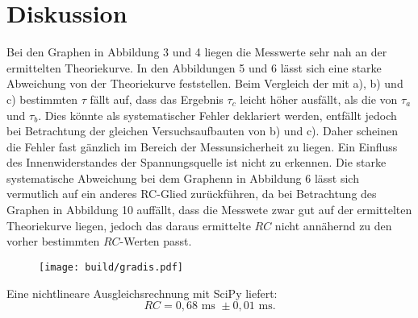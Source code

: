 \section{Diskussion}
\label{sec:Diskussion}\textbf{}
Bei den Graphen in Abbildung 3 und 4 liegen die Messwerte sehr nah an der ermittelten Theoriekurve. In den Abbildungen 5 und 6 lässt sich eine starke Abweichung von der Theoriekurve feststellen.
Beim Vergleich der mit a), b) und c) bestimmten $\tau$ fällt auf, dass das Ergebnis $\tau_c$ leicht höher ausfällt, als die von $\tau_a$ und $\tau_b$. Dies könnte als systematischer Fehler deklariert werden, entfällt jedoch bei Betrachtung der gleichen Versuchsaufbauten von b) und c). Daher scheinen die Fehler fast gänzlich im Bereich der Messunsicherheit zu liegen. Ein Einfluss des Innenwiderstandes der Spannungsquelle ist nicht zu erkennen. Die starke systematische Abweichung bei dem Graphenn in Abbildung 6 lässt sich vermutlich auf ein anderes RC-Glied zurückführen, da bei Betrachtung des Graphen in Abbildung 10 auffällt, dass die Messwete zwar gut auf der ermittelten Theoriekurve liegen, jedoch das daraus ermittelte $RC$ nicht annähernd zu den vorher bestimmten $RC$-Werten passt.
\begin{figure}[H]
	\centering
	\caption{}
	\texttt{[image: build/gradis.pdf]}
	\label{fig:Dis}
\end{figure}
Eine nichtlineare Ausgleichsrechnung mit SciPy \cite{scipy} liefert:
\begin{displaymath}
RC=0,68 \text{ ms } \pm 0,01 \text{ ms.}
\end{displaymath}






	
